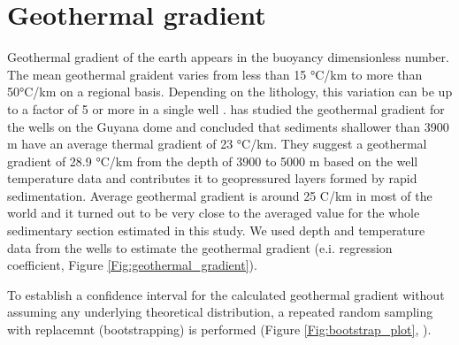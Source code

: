 \documentclass[review,authoryear, 12pt]{elsarticle}\usepackage[]{graphicx}\usepackage[]{color}
\begin{document}
\pagebreak


\section{Geothermal gradient}
Geothermal gradient of the earth appears in the buoyancy dimensionless number. The mean geothermal graident varies from less than 15 °C/km to more than 50°C/km on a regional basis. Depending on the lithology, this variation can be up to a factor of 5 or more in a single well \citep{tester2006future}. \citet{Gray2010} has studied the geothermal gradient for the wells on the Guyana dome and concluded that sediments shallower than 3900 m have an average thermal gradient of 23 °C/km. They suggest a geothermal gradient of 28.9 °C/km from the depth of 3900 to 5000 m based on the well temperature data and contributes it to geopressured layers formed by rapid sedimentation. Average geothermal gradient is around 25 C/km in most of the world \citep{fridleifsson2008possible} and it turned out to be very close to the averaged value for the whole sedimentary section estimated in this study.  We used depth and temperature data from the wells to estimate the geothermal gradient (e.i. regression coefficient, Figure \ref{Fig:geothermal_gradient}). 

To establish a confidence interval for the calculated geothermal gradient without assuming any underlying theoretical distribution, a repeated random sampling with replacemnt (bootstrapping) is performed (Figure \ref{Fig:bootstrap_plot}, \citet{white_note}).  
\end{document}
